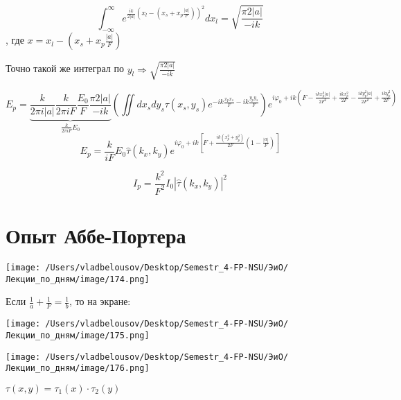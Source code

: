 \documentclass[12pt, a4paper]{report}
\begin{document}
\[ \int_{-\infty}^{\infty} e^{ \frac{ik }{2 \left\lvert a \right\rvert} \left( x_l -\left( x_s + x_p \frac{\left\lvert a \right\rvert}{F}  \right) \right) ^2 } d x_l =  \sqrt{\frac{\pi 2 \left\lvert a \right\rvert}{ - i k} }\] 
, где \( x = x_l - \displaystyle \left( x_s + x_p \frac{ \left\lvert a \right\rvert}{F}   \right) \) 

Точно такой же интеграл по \( y_l \Rightarrow \displaystyle  \sqrt{\frac{\pi 2 \left\lvert a \right\rvert}{- ik } } \) 

\[ E_p = \underbrace{\frac{ k }{2 \pi i \left\lvert a  \right\rvert} \frac{k }{2 \pi i F}  \frac{E_0 }{F } \frac{ \pi 2 \left\lvert a \right\rvert}{ - ik}}_{\frac{k}{2 \pi i F} E_0} \left( \iint d x_s d y_s \tau (x_s ,y_s )   e^{ - ik \frac{x_p x_s }{F }  - ik  \frac{y_p y_s}{F} }  \right)  e^{i \varphi_0 + ik \left(  F - \frac{ ik x_p ^2 \left\lvert a \right\rvert }{2 F ^2 }  + \frac{ik x_p ^2 }{2 F} - \frac{ik y_p ^2 \left\lvert a \right\rvert}{2 F ^2 } + \frac{ik y_p ^2 }{2 F}  \right)}    \] 
\[ E_p = \frac{k}{i F }  E_0 \hat{ \tau } (k_x ,k_y ) e^{ i \varphi_0  + ik \left[ F + \frac{ ik (x_p ^2 + y_p ^2 )}{2 F } \left( 1 - \frac{\left\lvert a \right\rvert}{F}  \right)  \right]}   \] 

\[ I_p = \frac{k ^2 }{F ^2 } I_0 \left\lvert \hat{ \tau} (k_x , k_y )  \right\rvert ^2   \] 

\section{Опыт Аббе-Портера}

\begin{center}
    \texttt{[image: /Users/vladbelousov/Desktop/Semestr\_4-FP-NSU/ЭиО/Лекции\_по\_дням/image/174.png]}
\end{center}

Если \( \displaystyle  \frac{1}{a }  + \frac{1}{F }  = \frac{1}{b}  \), то на экране: 

\begin{center}
    \texttt{[image: /Users/vladbelousov/Desktop/Semestr\_4-FP-NSU/ЭиО/Лекции\_по\_дням/image/175.png]}
\end{center}


\begin{center}
    \texttt{[image: /Users/vladbelousov/Desktop/Semestr\_4-FP-NSU/ЭиО/Лекции\_по\_дням/image/176.png]}
\end{center}
\( \tau (x,y ) = \tau_1 (x) \cdot \tau_2 (y) \) 
\end{document}
